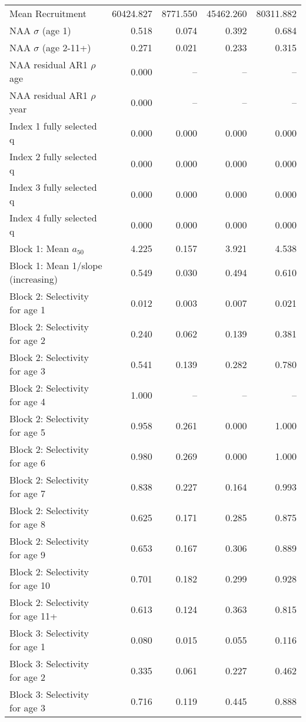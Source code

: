 \documentclass[
]{article}
\begin{document}
\begin{landscape}
\begin{longtable}[t]{lrrrr}
\endfoot
\bottomrule
\endlastfoot
Mean Recruitment & 60424.827 & 8771.550 & 45462.260 & 80311.882\\
NAA $\sigma$ (age 1) & 0.518 & 0.074 & 0.392 & 0.684\\
NAA $\sigma$ (age 2-11+) & 0.271 & 0.021 & 0.233 & 0.315\\
NAA residual AR1 $\rho$ age & 0.000 & -- & -- & --\\
NAA residual AR1 $\rho$ year & 0.000 & -- & -- & --\\
\addlinespace
Index 1 fully selected q & 0.000 & 0.000 & 0.000 & 0.000\\
Index 2 fully selected q & 0.000 & 0.000 & 0.000 & 0.000\\
Index 3 fully selected q & 0.000 & 0.000 & 0.000 & 0.000\\
Index 4 fully selected q & 0.000 & 0.000 & 0.000 & 0.000\\
Block 1: Mean $a_{50}$ & 4.225 & 0.157 & 3.921 & 4.538\\
\addlinespace
Block 1: Mean 1/slope (increasing) & 0.549 & 0.030 & 0.494 & 0.610\\
Block 2: Selectivity for age 1 & 0.012 & 0.003 & 0.007 & 0.021\\
Block 2: Selectivity for age 2 & 0.240 & 0.062 & 0.139 & 0.381\\
Block 2: Selectivity for age 3 & 0.541 & 0.139 & 0.282 & 0.780\\
Block 2: Selectivity for age 4 & 1.000 & -- & -- & --\\
\addlinespace
Block 2: Selectivity for age 5 & 0.958 & 0.261 & 0.000 & 1.000\\
Block 2: Selectivity for age 6 & 0.980 & 0.269 & 0.000 & 1.000\\
Block 2: Selectivity for age 7 & 0.838 & 0.227 & 0.164 & 0.993\\
Block 2: Selectivity for age 8 & 0.625 & 0.171 & 0.285 & 0.875\\
Block 2: Selectivity for age 9 & 0.653 & 0.167 & 0.306 & 0.889\\
\addlinespace
Block 2: Selectivity for age 10 & 0.701 & 0.182 & 0.299 & 0.928\\
Block 2: Selectivity for age 11+ & 0.613 & 0.124 & 0.363 & 0.815\\
Block 3: Selectivity for age 1 & 0.080 & 0.015 & 0.055 & 0.116\\
Block 3: Selectivity for age 2 & 0.335 & 0.061 & 0.227 & 0.462\\
Block 3: Selectivity for age 3 & 0.716 & 0.119 & 0.445 & 0.888\\

\end{longtable}
\end{landscape}
\end{document}
